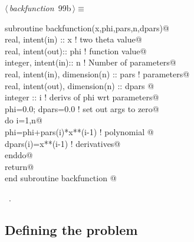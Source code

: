 \documentclass[10pt,a4paper,notitlepage]{article}
\begin{document}
\begin{flushleft} \small
\begin{minipage}{\linewidth}\label{scrap122}\raggedright\small
{} $\langle\,${\it backfunction}\nobreak\ {\footnotesize {99b}}$\,\rangle\equiv$
\vspace{-1ex}
\begin{list}{}{} \item
\mbox{}\verb@      subroutine backfunction(x,phi,pars,n,dpars)@\\
\mbox{}\verb@      real, intent(in) :: x     ! two theta value@\\
\mbox{}\verb@      real, intent(out):: phi   ! function value@\\
\mbox{}\verb@      integer, intent(in):: n   ! Number of parameters@\\
\mbox{}\verb@      real, intent(in),  dimension(n) :: pars  ! parameters@\\
\mbox{}\verb@      real, intent(out), dimension(n) :: dpars @\\
\mbox{}\verb@      integer :: i                       ! derivs of phi wrt parameters@\\
\mbox{}\verb@      phi=0.0; dpars=0.0 ! set out args to zero@\\
\mbox{}\verb@      do i=1,n@\\
\mbox{}\verb@        phi=phi+pars(i)*x**(i-1)                   ! polynomial @\\
\mbox{}\verb@        dpars(i)=x**(i-1)     ! derivatives@\\
\mbox{}\verb@      enddo@\\
\mbox{}\verb@      return@\\
\mbox{}\verb@      end subroutine backfunction                                            @{\NWsep}
\end{list}
\vspace{-1.5ex}
\footnotesize
\begin{list}{}{\setlength{\itemsep}{-\parsep}\setlength{\itemindent}{-\leftmargin}}
\item \NWtxtMacroRefIn\ .

\item{}
\end{list}
\end{minipage}\vspace{4ex}
\end{flushleft}
\subsection{Defining the problem}
\end{document}
